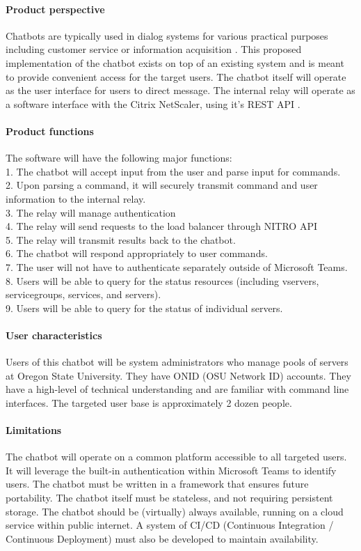 \paragraph{Product perspective}
Chatbots are typically used in dialog systems for various practical purposes including customer service or information acquisition \cite{chatbot}.
This proposed implementation of the chatbot exists on top of an existing system and is meant to provide convenient access for the target users.
The chatbot itself will operate as the user interface for users to direct message.
The internal relay will operate as a software interface with the Citrix NetScaler, using it's REST API \cite{citrixnitro}.

\paragraph{Product functions}
The software will have the following major functions:
\\1. The chatbot will accept input from the user and parse input for commands.
\\2. Upon parsing a command, it will securely transmit command and user information to the internal relay.
\\3. The relay will manage authentication
\\4. The relay will send requests to the load balancer through NITRO API
\\5. The relay will transmit results back to the chatbot.
\\6. The chatbot will respond appropriately to user commands.
\\7. The user will not have to authenticate separately outside of Microsoft Teams.
\\8. Users will be able to query for the status resources (including vservers, servicegroups, services, and servers).
\\9. Users will be able to query for the status of individual servers.

\paragraph{User characteristics}
Users of this chatbot will be system administrators who manage pools of servers at Oregon State University. They have ONID (OSU Network ID) accounts. They have a high-level of technical understanding and are familiar with command line interfaces. The targeted user base is approximately 2 dozen people.
\paragraph{Limitations}
The chatbot will operate on a common platform accessible to all targeted users.
It will leverage the built-in authentication within Microsoft Teams to identify users.
The chatbot must be written in a framework that ensures future portability.
The chatbot itself must be stateless, and not requiring persistent storage.
The chatbot should be (virtually) always available, running on a cloud service within public internet.
A system of CI/CD (Continuous Integration / Continuous Deployment) must also be developed to maintain availability.

